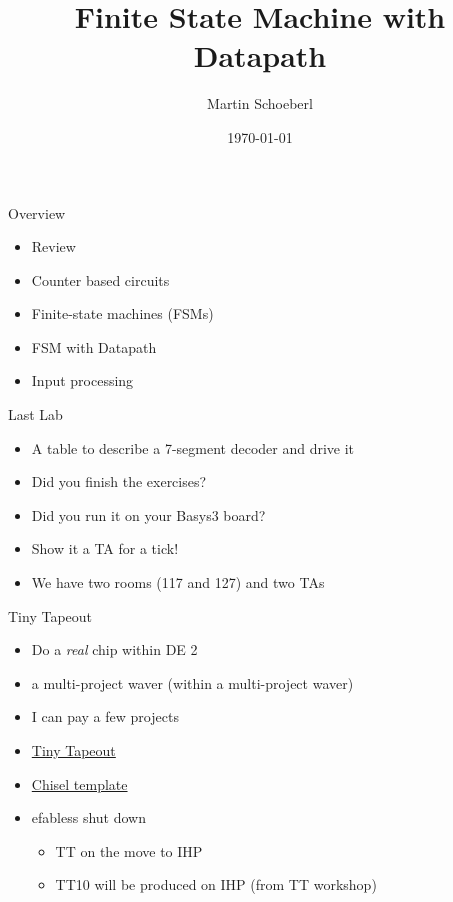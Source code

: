 

\newif\ifbook


\title{Finite State Machine with Datapath}
\author{Martin Schoeberl}
\date{\today}



\begin{frame}
\titlepage
\end{frame}




\begin{frame}[fragile]{Overview}
\begin{itemize}
\item Review 
\item Counter based circuits
\item Finite-state machines (FSMs)
\item FSM with Datapath
\item Input processing
\end{itemize}
\end{frame}

\begin{frame}[fragile]{Last Lab}
\begin{itemize}
\item A table to describe a 7-segment decoder and drive it
\item Did you finish the exercises?
\item Did you run it on your Basys3 board?
\item Show it a TA for a tick!
\item We have two rooms (117 and 127) and two TAs
\end{itemize}
\end{frame}

\begin{frame}[fragile]{Tiny Tapeout}
\begin{itemize}
\item Do a \emph{real} chip within DE 2
\item a multi-project waver (within a multi-project waver)
\item I can pay a few projects
\item \href{https://tinytapeout.com/}{Tiny Tapeout}
\item \href{https://github.com/TinyTapeout/tt10-chisel-template}{Chisel template}
\item efabless shut down
\begin{itemize}
\item TT on the move to IHP
\item TT10 will be produced on IHP (from TT workshop)
\end{itemize}
\end{itemize}
\end{frame}


